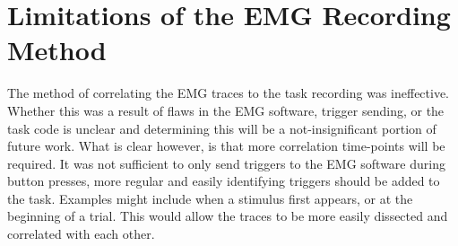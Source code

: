 \section{Limitations of the EMG Recording Method}
The method of correlating the EMG traces to the task recording was ineffective. Whether this was a result of flaws in the EMG software, trigger sending, or the task code is unclear and determining this will be a not-insignificant portion of future work. What is clear however, is that more correlation time-points will be required. It was not sufficient to only send triggers to the EMG software during button presses, more regular and easily identifying triggers should be added to the task. Examples might include when a stimulus first appears, or at the beginning of a trial. This would allow the traces to be more easily dissected and correlated with each other.
